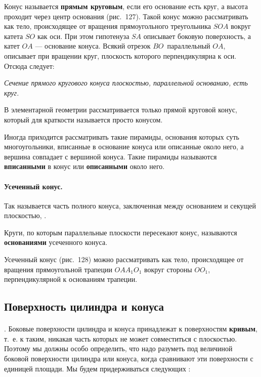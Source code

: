 \documentclass[twoside]{book}
\begin{document}
Конус называется \textbf{прямым круговым}, если его основание есть круг, а высота проходит через центр основания (рис.~127).
Такой конус можно рассматривать как тело, происходящее от вращения прямоугольного треугольника $SOA$ вокруг катета $SO$ как оси.
При этом гипотенуза $SA$ описывает боковую поверхность, а катет $OA$ --- основание конуса.
Всякий отрезок $BO$\, параллельный $OA$, описывает при вращении круг, плоскость которого перпендикулярна к оси.
Отсюда следует:

\emph{Сечение прямого кругового конуса плоскостью, параллельной основанию, есть круг.}

В элементарной геометрии рассматривается только прямой круговой конус, который для краткости называется просто конусом.

Иногда приходится рассматривать такие пирамиды, основания которых суть многоугольники, вписанные в основание конуса или описанные около него, а вершина совпадает с вершиной конуса.
Такие пирамиды называются \textbf{вписанными} в конус или \textbf{описанными} около него.

\paragraph{Усеченный конус.}\label{1938/s110}
Так называется часть полного конуса, заключенная между основанием и секущей плоскостью, .

Круги, по которым параллельные плоскости пересекают конус, называются \textbf{основаниями} усеченного конуса.

Усеченный конус (рис.~128) можно рассматривать как тело, происходящее от вращения прямоугольной трапеции $OAA_1O_1$ вокруг стороны $OO_1$, перпендикулярной к основаниям трапеции.

\subsection*{Поверхность цилиндра и конуса}

\paragraph{}\label{1938/s111}
.
Боковые поверхности цилиндра и конуса принадлежат к поверхностям \textbf{кривым}, т.~е. к таким, никакая часть которых не может совместиться с плоскостью.
Поэтому мы должны особо определить, что надо разуметь под величиной боковой поверхности цилиндра или конуса, когда сравнивают эти поверхности с  единицей площади.
Мы будем придерживаться следующих :
\end{document}
